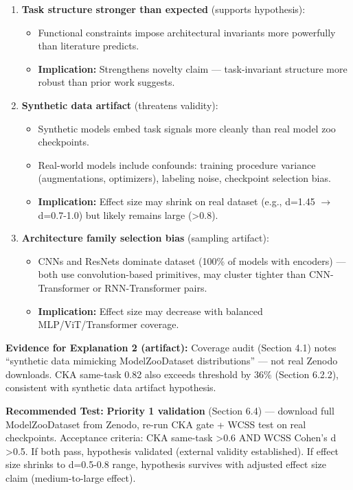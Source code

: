 \begin{enumerate}
\item \textbf{Task structure stronger than expected} (supports hypothesis):
\begin{itemize}
\item Functional constraints impose architectural invariants more powerfully than literature predicts.
\item \textbf{Implication:} Strengthens novelty claim --- task-invariant structure more robust than prior work suggests.
\end{itemize}

\item \textbf{Synthetic data artifact} (threatens validity):
\begin{itemize}
\item Synthetic models embed task signals more cleanly than real model zoo checkpoints.
\item Real-world models include confounds: training procedure variance (augmentations, optimizers), labeling noise, checkpoint selection bias.
\item \textbf{Implication:} Effect size may shrink on real dataset (e.g., d=1.45 $\to$ d=0.7-1.0) but likely remains large (>0.8).
\end{itemize}

\item \textbf{Architecture family selection bias} (sampling artifact):
\begin{itemize}
\item CNNs and ResNets dominate dataset (100\% of models with encoders) --- both use convolution-based primitives, may cluster tighter than CNN-Transformer or RNN-Transformer pairs.
\item \textbf{Implication:} Effect size may decrease with balanced MLP/ViT/Transformer coverage.
\end{itemize}
\end{enumerate}

\textbf{Evidence for Explanation 2 (artifact):} Coverage audit (Section 4.1) notes ``synthetic data mimicking ModelZooDataset distributions'' --- not real Zenodo downloads. CKA same-task 0.82 also exceeds threshold by 36\% (Section 6.2.2), consistent with synthetic data artifact hypothesis.

\textbf{Recommended Test:} \textbf{Priority 1 validation} (Section 6.4) --- download full ModelZooDataset from Zenodo, re-run CKA gate + WCSS test on real checkpoints. Acceptance criteria: CKA same-task >0.6 AND WCSS Cohen's d >0.5. If both pass, hypothesis validated (external validity established). If effect size shrinks to d=0.5-0.8 range, hypothesis survives with adjusted effect size claim (medium-to-large effect).

